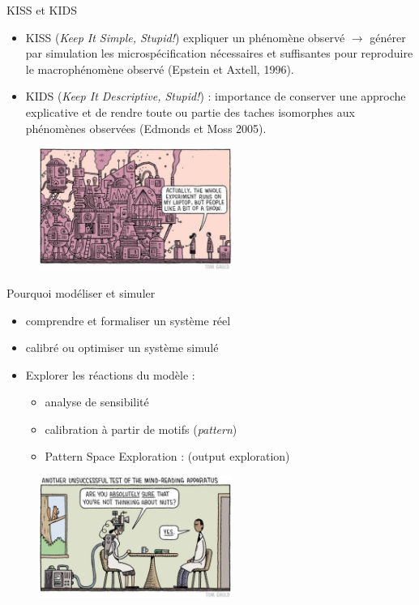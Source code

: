 \documentclass[newPxFont]{beamer}
\begin{document}
\begin{frame}[c]{KISS et KIDS}
  \vspace{-2em}
  \begin{itemize}
    \item KISS (\textit{Keep It Simple, Stupid!}) expliquer un phénomène observé $\rightarrow$ générer par simulation les microspécification nécessaires et suffisantes pour reproduire le macrophénomène observé (Epstein et Axtell, 1996).
    \item KIDS (\textit{Keep It Descriptive, Stupid!}) : importance de conserver une approche explicative et de rendre toute ou partie des taches isomorphes aux phénomènes observées (Edmonds et Moss 2005).
  \end{itemize}
  \vspace{-1em}
  \begin{figure}
   \includegraphics[height=4cm]{img/a_KIDS.jpg}
  \end{figure}
\end{frame}

\begin{frame}[c]{Pourquoi modéliser et simuler}
  \vspace{-2em}
  \begin{itemize}
    \item comprendre et formaliser un système réel
    \item calibré ou optimiser un système simulé
    \item Explorer les réactions du modèle :
    \begin{itemize}
      \item analyse de sensibilité
      \item calibration à partir de motifs (\textit{pattern})
      \item Pattern Space Exploration : (output exploration)
    \end{itemize}
  \end{itemize}
  \vspace{-1em}
  \begin{figure}
   \includegraphics[height=4cm]{img/a_gauld_nutts.jpg}
  \end{figure}
\end{frame}
\end{document}
